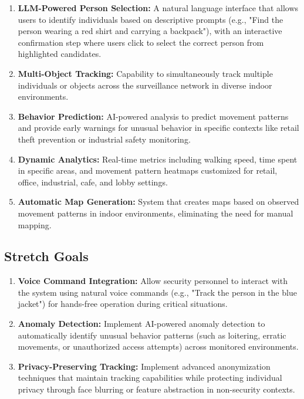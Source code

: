 \begin{enumerate}[leftmargin=80pt]
    \item \textbf{LLM-Powered Person Selection:} A natural language interface that allows users to identify individuals based on descriptive prompts (e.g., "Find the person wearing a red shirt and carrying a backpack"), with an interactive confirmation step where users click to select the correct person from highlighted candidates.
    \item \textbf{Multi-Object Tracking:} Capability to simultaneously track multiple individuals or objects across the surveillance network in diverse indoor environments.
    \item \textbf{Behavior Prediction:} AI-powered analysis to predict movement patterns and provide early warnings for unusual behavior in specific contexts like retail theft prevention or industrial safety monitoring.
    \item \textbf{Dynamic Analytics:} Real-time metrics including walking speed, time spent in specific areas, and movement pattern heatmaps customized for retail, office, industrial, cafe, and lobby settings.
    \item \textbf{Automatic Map Generation:} System that creates maps based on observed movement patterns in indoor environments, eliminating the need for manual mapping.
\end{enumerate}

\subsection{Stretch Goals}
\label{subsection:stretch-goals}

\begin{enumerate}[leftmargin=80pt]
    \item \textbf{Voice Command Integration:} Allow security personnel to interact with the system using natural voice commands (e.g., "Track the person in the blue jacket") for hands-free operation during critical situations.
    
    \item \textbf{Anomaly Detection:} Implement AI-powered anomaly detection to automatically identify unusual behavior patterns (such as loitering, erratic movements, or unauthorized access attempts) across monitored environments.
    
    \item \textbf{Privacy-Preserving Tracking:} Implement advanced anonymization techniques that maintain tracking capabilities while protecting individual privacy through face blurring or feature abstraction in non-security contexts.
    
\end{enumerate}


